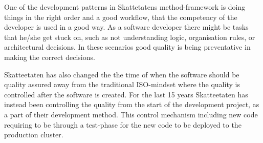 One of the development patterns in Skattetatens method-framework is doing things in the right order and a good workflow, that the competency of the developer is used in a good way. As a software developer there might be tasks that he/she get stuck on, such as not understanding logic, organisation rules, or architectural decisions. In these scenarios good quality is being preventative in making the correct decisions.

Skatteetaten has also changed the the time of when the software should be quality assured away from the traditional ISO-mindset where the quality is controlled after the software is created. For the last 15 years Skatteetaten has instead been controlling the quality from the start of the development project, as a part of their development method. This control mechanism including new code requiring to be through a test-phase for the new code to be deployed to the production cluster.





